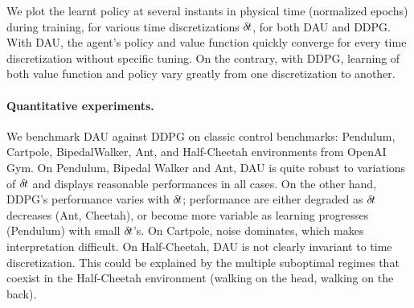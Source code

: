 We plot the learnt policy at several instants in physical time
(normalized epochs) during training, for various time discretizations
${\delta\hspace{-.1em}t}$, for both DAU and DDPG. With DAU, the agent's policy and value
function quickly converge for every time discretization without specific
tuning. On the contrary, with DDPG, learning of both value function and
policy vary greatly from one discretization to another.

\paragraph{Quantitative experiments.}
We benchmark DAU against DDPG on classic control benchmarks: Pendulum,
Cartpole, BipedalWalker, Ant, and Half-Cheetah environments from OpenAI Gym. On
Pendulum, Bipedal Walker and Ant, DAU is quite robust to variations of
${\delta\hspace{-.1em}t}$ and displays reasonable performances in all cases. On the other hand,
DDPG's performance varies with ${\delta\hspace{-.1em}t}$; performance are either degraded as
${\delta\hspace{-.1em}t}$ decreases (Ant, Cheetah), or become more variable as learning
progresses (Pendulum) with small ${\delta\hspace{-.1em}t}$'s. On Cartpole, noise dominates,
which makes interpretation difficult. On Half-Cheetah, DAU is not clearly
invariant to time discretization. This could be explained by the multiple
suboptimal regimes that coexist in the Half-Cheetah environment (walking on the
head, walking on the back).

% 


